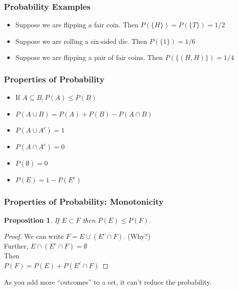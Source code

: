 \documentclass[handout]{beamer}
\newtheorem{prop}{Proposition}
\numberwithin{equation}{section}
\begin{document}
\begin{frame}
\frametitle{Probability Examples}

\pause 

\begin{itemize}
\item[-] Suppose we are flipping a \alert{fair} coin.  Then $P(\{H\}) = P(\{T\}) = 1/2 $\pause 
\item[-] Suppose we are rolling a six-sided die.  Then $P(\{1\}) = 1/6$ \pause 
\item[-] Suppose we are flipping a pair of fair coins.  Then $P(\{(H, H)\}) = 1/4$
\end{itemize}

\end{frame}

\begin{frame}
\frametitle{Properties of Probability}

\pause 

\begin{itemize}
\item[-] If $A\subseteq B, P(A)\leq P(B) $\pause 
\item[-] $P(A\cup B)= P(A)+P(B)-P(A\cap B)$  \pause 
\item[-] $P(A\cup A^{c}) = 1$
\item[-] $P(A\cap A^{c}) = 0$ 
\item[-] $P(\emptyset) = 0 $  
\item[-] $P(E) = 1 - P(E^{c})  $ 
\end{itemize}

\end{frame}

\begin{frame}
\frametitle{Properties of Probability: Monotonicity} 
\pause 
\begin{prop} 
If $E \subset F$ then $P(E) \leq P(F)$.  
\end{prop}  \pause 
\begin{proof}  \pause 
We can write $F = E \cup ( E^{c} \cap F)$. (Why?) \\ \pause 
Further, $E\cap(E^{c} \cap F )= \emptyset$ \\
\pause 
Then \\ \pause 
$P(F) = P(E) + P(E^{c} \cap F) $  \pause 
\end{proof}
As you add more ``outcomes''  to a set, it can't reduce the
probability.  
\end{frame}
\end{document}

